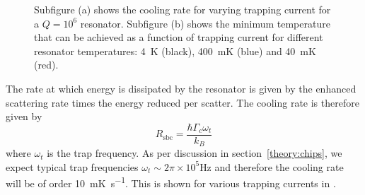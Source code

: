 \begin{figure}[htb]
  \centering
  \begin{subfigure}[b]{0.44\textwidth}
  \end{subfigure}
  \hspace{1cm}
  \begin{subfigure}[b]{0.44\textwidth}
  \end{subfigure}
  \caption{
    Subfigure (a) shows the cooling rate for varying trapping current for a
    $Q=10^6$ resonator. Subfigure (b) shows the minimum temperature that can be
    achieved as a function of trapping current for different resonator
    temperatures: \SI{4}{\kelvin} (black), \SI{400}{\milli\kelvin} (blue) and
    \SI{40}{\milli\kelvin} (red).
    }
    \label{mws:fig:sbtemps}
\end{figure}
%
The rate at which energy is dissipated by the resonator is given by the
enhanced scattering rate times the energy reduced per scatter. The cooling rate
is therefore given by
%
\begin{equation}
  R_\text{sbc} = \frac{\hbar\Gamma_c\omega_t}{k_B}
\end{equation}
%
where 
$\omega_t$ is the trap frequency.
As per discussion in section~\ref{theory:chips}, we expect typical trap
frequencies $\omega_t\sim 2\pi \times 10^5 \si{\hertz}$ and therefore the
cooling rate will be of order \SI{10}{\milli\kelvin\per\second}. This is shown
for various trapping currents in .

